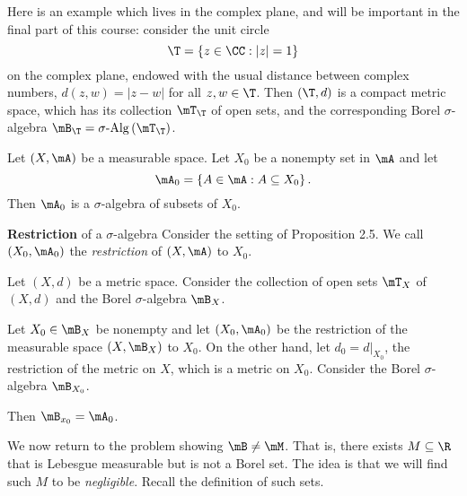 \documentclass[pmath450]{subfiles}
\begin{document}
    \np Here is an example which lives in the complex plane, and will be important in the final part of this course: consider the unit circle
    \begin{equation*}
        \T = \left\lbrace z\in\CC: \left| z \right|=1 \right\rbrace
    \end{equation*}
    on the complex plane, endowed with the usual distance between complex numbers, $d\left( z,w \right)=\left| z-w \right|$ for all $z,w\in\T$. Then $\left( \T,d \right)$ is a compact metric space, which has its collection $\mT_{\T}$ of open sets, and the corresponding Borel $\sigma$-algebra $\mB_{\T}=\sigalg\left( \mT_{\T} \right)$.

    \begin{prop}{}
        Let $\left( X,\mA \right)$ be a measurable space. Let $X_0$ be a nonempty set in $\mA$ and let
        \begin{equation*}
            \mA_0 = \left\lbrace A\in\mA: A\subseteq X_0 \right\rbrace.
        \end{equation*}
        Then $\mA_0$ is a $\sigma$-algebra of subsets of $X_0$.
    \end{prop}


    \begin{definition}{\textbf{Restriction} of a $\sigma$-algebra}
        Consider the setting of Proposition 2.5. We call $\left( X_0,\mA_0 \right)$ the \emph{restriction} of $\left( X,\mA \right)$ to $X_0$.
    \end{definition}

    \begin{prop}{}
        Let $\left( X,d \right)$ be a metric space. Consider the collection of open sets $\mT_X$ of $\left( X,d \right)$ and the Borel $\sigma$-algebra $\mB_X$.

        Let $X_0\in\mB_X$ be nonempty and let $\left( X_0,\mA_0 \right)$ be the restriction of the measurable space $\left( X,\mB_X \right)$ to $X_0$. On the other hand, let $d_0=d|_{X_0}$, the restriction of the metric on $X$, which is a metric on $X_0$. Consider the Borel $\sigma$-algebra $\mB_{X_0}$.

        Then $\mB_{x_0} = \mA_0$.
    \end{prop}

    \placeqed[tl;dr]

    \np We now return to the problem showing $\mB\neq\mM$. That is, there exists $M\subseteq\R$ that is Lebesgue measurable but is not a Borel set. The idea is that we will find such $M$ to be \textit{negligible}. Recall the definition of such sets.
\end{document}
